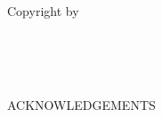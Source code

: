 \documentclass[12pt,letterpaper,twoside]{report}
\begin{document}
\thispagestyle{empty}
\mbox{}\vspace{6in}\\
\begin{flushleft}
Copyright by \\
\MakeUppercase{\authorName} \\
\graduationYear \\
\end{flushleft}
\newpage

\setcounter{page}{5}

\begin{centering}
\ \vfill



\vfill
\end{centering}
\newpage


\begin{centering}
\vspace{5ex}
ACKNOWLEDGEMENTS \par
\end{centering}
\begin{doublespace}
\vspace{0.575in} %



\end{doublespace}
\newpage


\tableofcontents %
\newpage


\begin{singlespace}
\raggedbottom
\listoftables
\end{singlespace}


\newpage


\begin{singlespace}
\makeatletter
\let\l@figureOLD \l@figure
\renewcommand{\l@figure}{\vspace{\baselineskip}\l@figureOLD}
\makeatother
{}
\raggedbottom

\listoffigures

\setlength{\topmargin}{0in}
\newpage
\setlength{\parskip}{0 cm} \setlength{\topmargin}{0in}
\end{singlespace}
\end{document}
